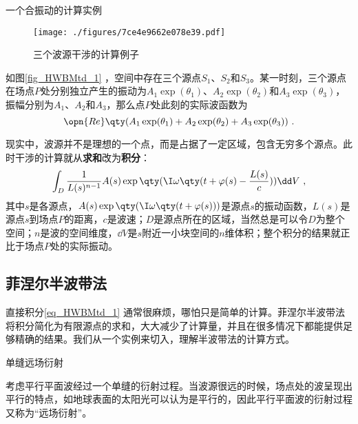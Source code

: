 \begin{example}{一个合振动的计算实例}

\begin{figure}[ht]
\centering
\texttt{[image: ./figures/7ce4e9662e078e39.pdf]}
\caption{三个波源干涉的计算例子} \label{fig_HWBMtd_1}
\end{figure}

如图\autoref{fig_HWBMtd_1} ，空间中存在三个源点$S_1$、$S_2$和$S_3$。某一时刻，三个源点在场点$P$处分别独立产生的振动为$A_1\exp(\theta_1)$、$A_2\exp(\theta_2)$和$A_3\exp(\theta_3)$，振幅分别为$A_1$、$A_2$和$A_3$，那么点$P$处此刻的实际波函数为
\begin{equation}
\opn{Re}\qty(A_1\exp(\theta_1)+A_2\exp(\theta_2)+A_3\exp(\theta_3))~. 
\end{equation}

\end{example}




现实中，波源并不是理想的一个点，而是占据了一定区域，包含无穷多个源点。此时干涉的计算就从\textbf{求和}改为\textbf{积分}：
\begin{equation}\label{eq_HWBMtd_1}
\int_D \frac{1}{L(s)^{n-1}}A(s)\exp\qty(\I\omega\qty(t+\varphi(s)-\frac{L(s)}{c}))\dd V~, 
\end{equation}
其中$s$是各源点，$A(s)\exp\qty(\I\omega\qty(t+\varphi(s)))$是源点$s$的振动函数，$L(s)$是源点$s$到场点$P$的距离，$c$是波速；$D$是源点所在的区域，当然总是可以令$D$为整个空间；$n$是波的空间维度，$\dd V$是$s$附近一小块空间的$n$维体积；整个积分的结果就正比于场点$P$处的实际振动。




\subsection{菲涅尔半波带法}


直接积分\autoref{eq_HWBMtd_1} 通常很麻烦，哪怕只是简单的计算。菲涅尔半波带法将积分简化为有限源点的求和，大大减少了计算量，并且在很多情况下都能提供足够精确的结果。我们从一个实例来切入，理解半波带法的计算方式。




\begin{example}{单缝远场衍射}

考虑平行平面波经过一个单缝的衍射过程。当波源很远的时候，场点处的波呈现出平行的特点，如地球表面的太阳光可以认为是平行的，因此平行平面波的衍射过程又称为“远场衍射”。

\end{example}























